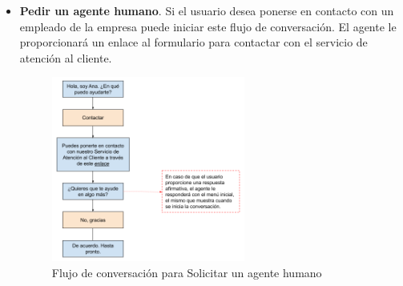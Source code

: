 \begin{itemize}
\begin{figure}
\begin{center}
    	\end{center}
    \end{figure}
\newpage
    \item \textbf{Pedir un agente humano}. Si el usuario desea ponerse en contacto con un empleado de la empresa puede iniciar este flujo de conversación. El agente le proporcionará un enlace al formulario para contactar con el servicio de atención al cliente.
    \begin{figure}[ht]
    	\begin{center}
    		\includegraphics[width = 0.60\textwidth]{Figuras/Contactar.png}
    	\end{center}
	\caption{\label{fig:contactarAgente} Flujo de conversación para Solicitar un agente humano}
    \end{figure}
    

\end{itemize}
